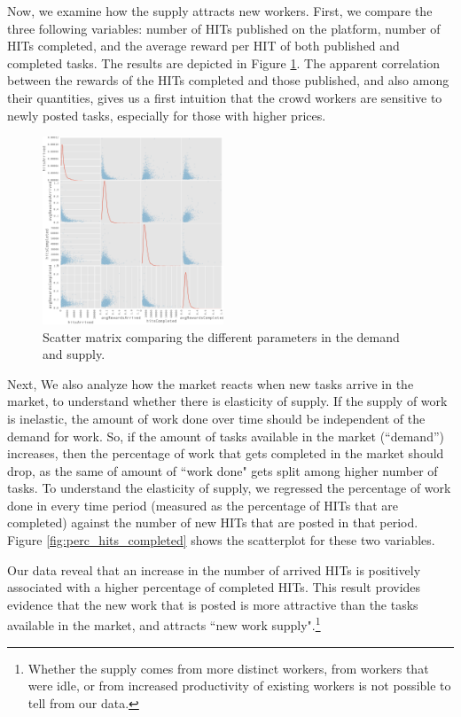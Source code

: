 Now, we examine how the supply attracts new workers. First, we compare the three following variables: number of HITs published on the platform, number of HITs completed, and the average reward per HIT of both published and completed tasks. The results are depicted in Figure \ref{fig:scatter_matrix}. The apparent correlation between the rewards of the HITs completed and those published, and also among their quantities, gives us a first intuition that the crowd workers are sensitive to newly posted tasks, especially for those with higher prices.

\begin{figure}[t!]
	\centering
		\includegraphics[width=0.48\textwidth]{figures/scatter}
	\caption{Scatter matrix comparing the different parameters in the demand and supply.}
	\label{fig:scatter_matrix}
\end{figure}

Next, We also analyze how the market reacts when new tasks arrive in the
market, to understand whether there is elasticity of supply. If the
supply of work is inelastic, the amount of work done over time should
be independent of the demand for work. So, if the amount of tasks
available in the market (``demand'') increases, then the percentage of
work that gets completed in the market should drop, as the same of
amount of ``work done" gets split among higher number of tasks. To
understand the elasticity of supply, we regressed the percentage of
work done in every time period (measured as the percentage of HITs
that are completed) against the number of new HITs that are posted in
that period. Figure \ref{fig:perc_hits_completed} shows the scatterplot for these two variables.

Our data reveal that an increase in the number of arrived HITs is
positively associated with a higher percentage of completed HITs. This
result provides evidence that the new work that is posted is more
attractive than the tasks available in the market, and attracts ``new
work supply".\footnote{Whether the supply comes from more distinct
workers, from workers that were idle, or from increased productivity
of existing workers is not possible to tell from our data.}


